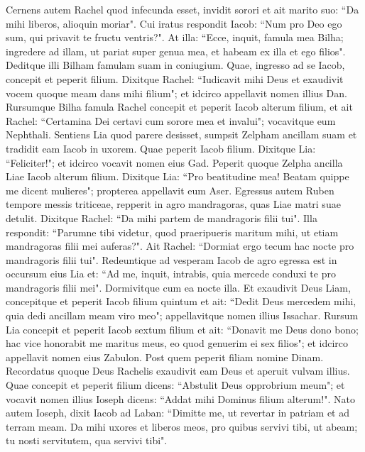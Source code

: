 \begin{biblechapter}  
\verse Cernens autem Rachel quod infecunda esset, invidit sorori et ait marito suo: “Da mihi liberos, alioquin moriar". 
\verse Cui iratus respondit Iacob: “Num pro Deo ego sum, qui privavit te fructu ventris?". 
\verse At illa: “Ecce, inquit, famula mea Bilha; ingredere ad illam, ut pariat super genua mea, et habeam ex illa et ego filios". 
\verse Deditque illi Bilham famulam suam in coniugium. Quae, 
\verse ingresso ad se Iacob, concepit et peperit filium. 
\verse Dixitque Rachel: “Iudicavit mihi Deus et exaudivit vocem quoque meam dans mihi filium"; et idcirco appellavit nomen illius Dan. 
\verse Rursumque Bilha famula Rachel concepit et peperit Iacob alterum filium, et  
\verse ait Rachel: “Certamina Dei certavi cum sorore mea et invalui"; vocavitque eum Nephthali. 
\verse Sentiens Lia quod parere desisset, sumpsit Zelpham ancillam suam et tradidit eam Iacob in uxorem. 
\verse Quae peperit Iacob filium. 
\verse Dixitque Lia: “Feliciter!"; et idcirco vocavit nomen eius Gad. 
\verse Peperit quoque Zelpha ancilla Liae Iacob alterum filium. 
\verse Dixitque Lia: “Pro beatitudine mea! Beatam quippe me dicent mulieres"; propterea appellavit eum Aser. 
\verse Egressus autem Ruben tempore messis triticeae, repperit in agro mandragoras, quas Liae matri suae detulit. Dixitque Rachel: “Da mihi partem de mandragoris filii tui". 
\verse Illa respondit: “Parumne tibi videtur, quod praeripueris maritum mihi, ut etiam mandragoras filii mei auferas?". Ait Rachel: “Dormiat ergo tecum hac nocte pro mandragoris filii tui". 
\verse Redeuntique ad vesperam Iacob de agro egressa est in occursum eius Lia et: “Ad me, inquit, intrabis, quia mercede conduxi te pro mandragoris filii mei". Dormivitque cum ea nocte illa. 
\verse Et exaudivit Deus Liam, concepitque et peperit Iacob filium quintum  
\verse et ait: “Dedit Deus mercedem mihi, quia dedi ancillam meam viro meo"; appellavitque nomen illius Issachar. 
\verse Rursum Lia concepit et peperit Iacob sextum filium 
\verse et ait: “Donavit me Deus dono bono; hac vice honorabit me maritus meus, eo quod genuerim ei sex filios"; et idcirco appellavit nomen eius Zabulon. 
\verse Post quem peperit filiam nomine Dinam. 
\verse Recordatus quoque Deus Rachelis exaudivit eam Deus et aperuit vulvam illius. 
\verse Quae concepit et peperit filium dicens: “Abstulit Deus opprobrium meum"; 
\verse et vocavit nomen illius Ioseph dicens: “Addat mihi Dominus filium alterum!". 
\verse Nato autem Ioseph, dixit Iacob ad Laban: “Dimitte me, ut revertar in patriam et ad terram meam. 
\verse Da mihi uxores et liberos meos, pro quibus servivi tibi, ut abeam; tu nosti servitutem, qua servivi tibi". 

\end{biblechapter}
